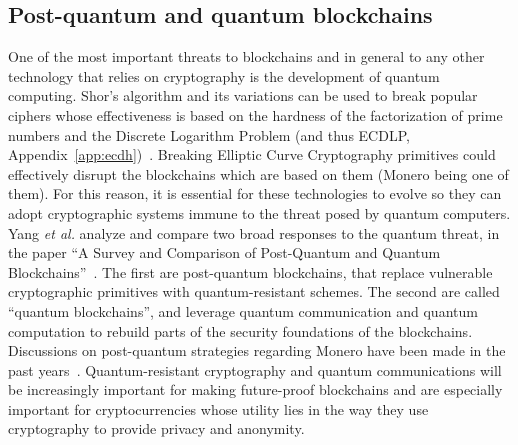 \documentclass[conference]{IEEEtran}
\begin{document}
\subsection{Post-quantum and quantum blockchains}
One of the most important threats to blockchains and in general to any other technology that relies on cryptography is the development of quantum computing. Shor's algorithm and its variations can be used to break popular ciphers whose effectiveness is based on the hardness of the factorization of prime numbers and the Discrete Logarithm Problem (and thus ECDLP, Appendix~\ref{app:ecdh})~\cite{shor_dlp}. Breaking Elliptic Curve Cryptography primitives could effectively disrupt the blockchains which are based on them (Monero being one of them). For this reason, it is essential for these technologies to evolve so they can adopt cryptographic systems immune to the threat posed by quantum computers.\\
Yang \emph{et al.} analyze and compare two broad responses to the quantum threat, in the paper ``A Survey and Comparison of Post-Quantum and Quantum Blockchains''~\cite{quantum_blockchains}. The first are post-quantum blockchains, that replace vulnerable cryptographic primitives with quantum-resistant schemes. The second are called ``quantum blockchains'', and leverage quantum communication and quantum computation to rebuild parts of the security foundations of the blockchains.\\
Discussions on post-quantum strategies regarding Monero have been made in the past years~\cite{monero_quantum_ccs}. Quantum-resistant cryptography and quantum communications will be increasingly important for making future-proof blockchains and are especially important for cryptocurrencies whose utility lies in the way they use cryptography to provide privacy and anonymity.


\end{document}
